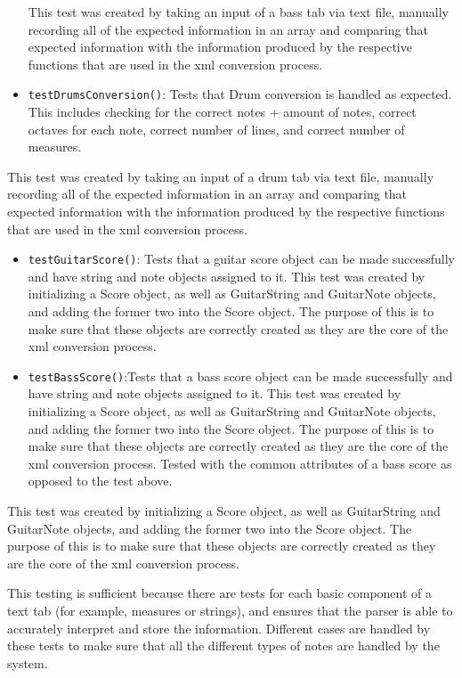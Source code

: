 \documentclass[11pt]{article}
\begin{document}
\begin{itemize}
This test was created by taking an input of a bass tab via text file, manually recording all of the expected information in an array and comparing that expected information with the information produced by the respective functions that are used in the xml conversion process.
\item \texttt{testDrumsConversion()}: Tests that Drum conversion is handled as expected. This includes checking for the correct notes + amount of notes, correct octaves for each note, correct number of lines, and correct number of measures.
\end{itemize}
This test was created by taking an input of a drum tab via text file, manually recording all of the expected information in an array and comparing that expected information with the information produced by the respective functions that are used in the xml conversion process.
\begin{itemize}
\item \texttt{testGuitarScore()}: Tests that a guitar score object can be made successfully and have string and note objects assigned to it.
This test was created by initializing a Score object, as well as GuitarString and GuitarNote objects, and adding the former two into the Score object. The purpose of this is to make sure that these objects are correctly created as they are the core of the xml conversion process.
\item \texttt{testBassScore()}:Tests that a bass score object can be made successfully and have string and note objects assigned to it.
This test was created by initializing a Score object, as well as GuitarString and GuitarNote objects, and adding the former two into the Score object. The purpose of this is to make sure that these objects are correctly created as they are the core of the xml conversion process. Tested with the common attributes of a bass score as opposed to the test above.
\end{itemize}
This test was created by initializing a Score object, as well as GuitarString and GuitarNote objects, and adding the former two into the Score object. The purpose of this is to make sure that these objects are correctly created as they are the core of the xml conversion process.

This testing is sufficient because there are tests for each basic component of a text tab (for example, measures or strings), and ensures that the parser is able to accurately interpret and store the information. Different cases are handled by these tests to make sure that all the different types of notes are handled by the system.
\end{document}
